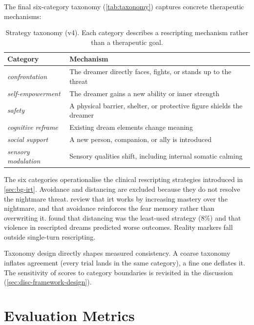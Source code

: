 The final six-category taxonomy (\autoref{tab:taxonomy}) captures
concrete therapeutic mechanisms:

\begin{table}[t]
  \centering
  \caption{Strategy taxonomy (v4). Each category describes a rescripting mechanism rather than a therapeutic goal.}
  \label{tab:taxonomy}
  \begin{tabularx}{\textwidth}{lX}
    \toprule
    Category & Mechanism \\
    \midrule
    \emph{confrontation}      & The dreamer directly faces, fights, or stands up to the threat \\
    \emph{self-empowerment}   & The dreamer gains a new ability or inner strength \\
    \emph{safety}              & A physical barrier, shelter, or protective figure shields the dreamer \\
    \emph{cognitive reframe}  & Existing dream elements change meaning \\
    \emph{social support}     & A new person, companion, or ally is introduced \\
    \emph{sensory modulation} & Sensory qualities shift, including internal somatic calming \\
    \bottomrule
  \end{tabularx}
\end{table}

The six categories operationalise the clinical rescripting strategies
introduced in \autoref{sec:bg-irt}. Avoidance and distancing are
excluded because they do not resolve the nightmare threat.
\textcite{34DFEBDG} review that \gls{irt} works by increasing mastery
over the nightmare, and that avoidance reinforces the fear memory rather
than overwriting it. \textcite{25UR8BHJ} found that distancing was the
least-used strategy (8\%) and that violence in rescripted dreams
predicted worse outcomes. Reality markers fall outside single-turn
rescripting.

Taxonomy design directly shapes measured consistency. A coarse taxonomy
inflates agreement (every trial lands in the same category), a fine one
deflates it. The sensitivity of scores to category boundaries is
revisited in the discussion (\autoref{sec:disc-framework-design}).



\section{Evaluation Metrics}
\label{sec:meth-metrics}

